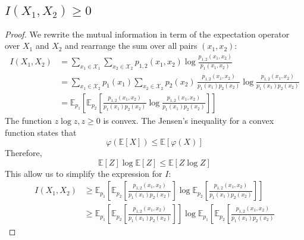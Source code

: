\documentclass{article}
\numberwithin{equation}{section}
\theoremstyle{casep}
\begin{document}
\subsection{$I(X_1, X_2) \geq 0$}
\begin{proof}
        We rewrite the mutual information in term of the expectation operator 
        over $X_1$ and $X_2$ and rearrange the sum over all pairs $(x_1, x_2)$:
        \begin{align*}
                I(X_1, X_2) &= \sum_{x_1 \in \mathcal{X}_1} \sum_{x_2 \in \mathcal{X}_2} 
                p_{1,2}(x_1, x_2) 
                \log \frac{p_{1,2}(x_1, x_2)}{p_1(x_1, x_2)}
                \\
                &= 
                \sum_{x_1 \in \mathcal{X}_2} p_1(x_1)
                \sum_{x_2 \in \mathcal{X}_2} p_2(x_2) \, 
                \frac{p_{1,2}(x_1, x_2)}{p_1(x_1) p_2(x_2)}
                \log \frac{p_{1,2}(x_1, x_2)}{p_1(x_1)p_2(x_2)}
                \\
                &= \mathbb{E}_{p_1}\left[ \mathbb{E}_{p_2}\left[
                \frac{p_{1,2}(x_1, x_2)}{p_1(x_1) p_2(x_2)}
                \log \frac{p_{1,2}(x_1, x_2)}{p_1(x_1)p_2(x_2)}
                \right] \right]  
        \end{align*}
        The function $z \log z, z \geq 0$ is convex. The Jensen's inequality 
        for a convex function states that
        \[
                \varphi \left( \mathbb{E}\left[ X\right]  \right)
                \leq \mathbb{E}\left[ \varphi(X)\right] 
        \]
        Therefore, 
        \[
                \mathbb{E}\left[ Z\right]\log \mathbb{E}\left[ Z\right] 
                \leq \mathbb{E}\left[ Z \log Z\right] 
        \]
        This allow us to simplify the expression for $I$:
        \begin{align*}
                I(X_1, X_2) &\geq 
                \mathbb{E}_{p_1}\left[ \mathbb{E}_{p_2}\left[ 
                                \frac{p_{1,2}(x_1, x_2)}{p_1(x_1)p_2(x_2)}
                \right] 
                \log\mathbb{E}_{p_2}\left[ \frac{p_{1,2}(x_1, x_2)}{p_1(x_1)p_2(x_2)} \right] 
        \right] 
        \\
                            &\geq
                            \mathbb{E}_{p_1} \left[ \mathbb{E}_{p_2} \left[ 
                                            \frac{p_{1,2}(x_1, x_2)}{p_1(x_1)p_2(x_2)}
                            \right] \right]
                            \log \mathbb{E}_{p_1} \left[  \mathbb{E}_{p_2} \left[ 
                                            \frac{p_{1, 2}(x_1, x_2)}{p_1(x_1)p_2(x_2)}

\end{align*}
\end{proof}
\end{document}
